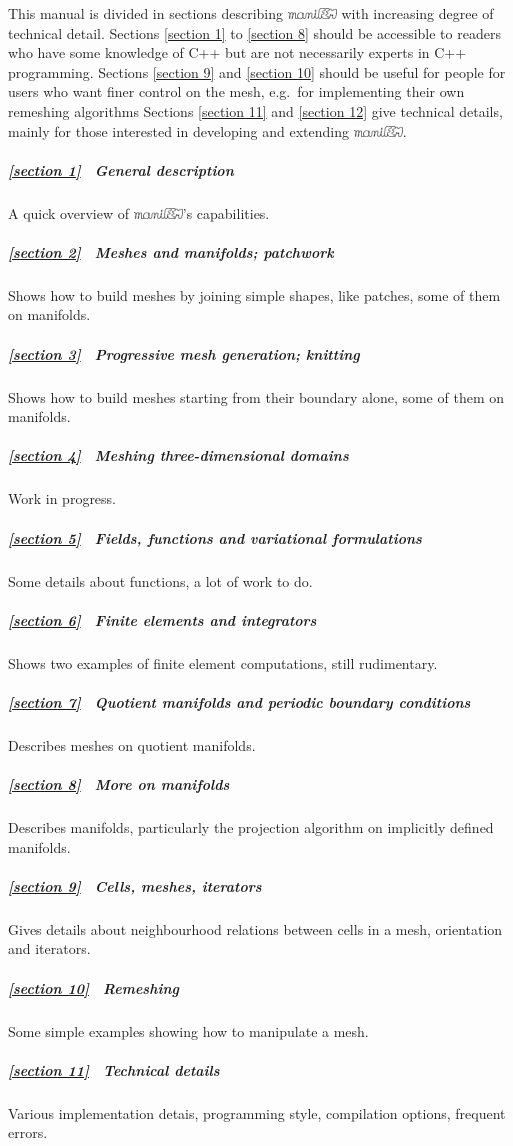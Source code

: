 \documentclass[a4paper]{scrreprt}
\def\numb{}
\newcommand\maniFEM{\leavevmode\hbox{\includegraphics[width=13mm]{manifem-small}}}
\newcommand\cinza[1]{\textcolor{coment}{#1}}
\renewcommand\tt{\normalfont\ttfamily}
\begin{document}
This manual is divided in sections describing {\maniFEM} with increasing degree of technical
detail.
Sections \ref{\numb section 1} to \ref{\numb section 8} should be accessible to readers
who have some knowledge of {\tt C++} but are not necessarily experts in {\tt C++} programming.
Sections \ref{\numb section 9} and \ref{\numb section 10} should be useful for people
for users who want finer control on the mesh,
e.g.\ for implementing their own remeshing algorithms
Sections \ref{\numb section 11} and \ref{\numb section 12} give technical details,
mainly for those interested in developing and extending \maniFEM.

\subparagraph*{\ref{\numb section 1} \ General description}
A quick overview of \maniFEM's capabilities.

\subparagraph*{\ref{\numb section 2} \ Meshes and manifolds; patchwork}
Shows how to build meshes by joining simple shapes, like patches, some of them on manifolds.

\subparagraph*{\ref{\numb section 3} \ Progressive mesh generation; knitting}
Shows how to build meshes starting from their boundary alone, some of them on manifolds.

\subparagraph*{\ref{\numb section 4} \ \cinza{Meshing three-dimensional domains}}
Work in progress.

\subparagraph*{\ref{\numb section 5} \ Fields, functions and variational formulations}
Some details about functions, a lot of work to do.

\subparagraph*{\ref{\numb section 6} \ Finite elements and integrators}
Shows two examples of finite element computations, still rudimentary.

\subparagraph*{\ref{\numb section 7} \ Quotient manifolds and periodic boundary conditions}
Describes meshes on quotient manifolds.

\subparagraph*{\ref{\numb section 8} \ More on manifolds}
Describes manifolds, particularly the projection algorithm on implicitly defined manifolds.

\subparagraph*{\ref{\numb section 9} \ Cells, meshes, iterators}
Gives details about neighbourhood relations between cells in a mesh, orientation and iterators.

\subparagraph*{\ref{\numb section 10} \ Remeshing}
Some simple examples showing how to manipulate a mesh.

\subparagraph*{\ref{\numb section 11} \ Technical details}
Various implementation detais, programming style, compilation options, frequent errors.
\end{document}

